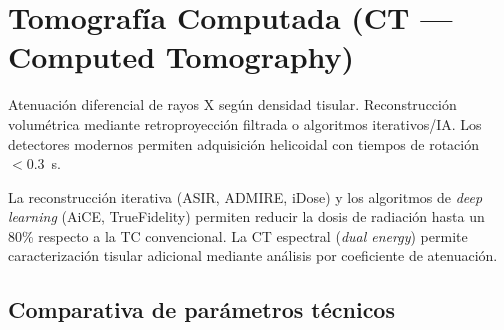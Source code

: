 \documentclass[11pt, a4paper]{article}
\begin{document}
\newpage

\section{Tomografía Computada (CT --- Computed Tomography)}

\begin{principiobox}
Atenuación diferencial de rayos X según densidad tisular. Reconstrucción volumétrica
mediante retroproyección filtrada o algoritmos iterativos/IA.
Los detectores modernos permiten adquisición helicoidal con tiempos de rotación $< 0.3$~s.
\end{principiobox}

\vspace{6pt}
La reconstrucción iterativa (ASIR, ADMIRE, iDose) y los algoritmos de \textit{deep learning}
(AiCE, TrueFidelity) permiten reducir la dosis de radiación hasta un 80\% respecto a la TC
convencional. La CT espectral (\textit{dual energy}) permite caracterización tisular adicional
mediante análisis por coeficiente de atenuación.

\subsection{Comparativa de parámetros técnicos}
\end{document}
